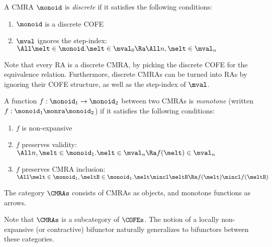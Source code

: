 \begin{defn}
  A CMRA $\monoid$ is \emph{discrete} if it satisfies the following conditions:
  \begin{enumerate}[itemsep=0pt]
  \item $\monoid$ is a discrete COFE
  \item $\mval$ ignores the step-index: \\
    $\All \melt \in \monoid. \melt \in \mval_0 \Ra \All n, \melt \in \mval_n$
  \end{enumerate}
\end{defn}
Note that every RA is a discrete CMRA, by picking the discrete COFE for the equivalence relation.
Furthermore, discrete CMRAs can be turned into RAs by ignoring their COFE structure, as well as the step-index of $\mval$.

\begin{defn}
  A function $f : \monoid_1 \to \monoid_2$ between two CMRAs is \emph{monotone} (written $f : \monoid_1 \monra \monoid_2$) if it satisfies the following conditions:
  \begin{enumerate}[itemsep=0pt]
  \item $f$ is non-expansive
  \item $f$ preserves validity: \\
    $\All n, \melt \in \monoid_1. \melt \in \mval_n \Ra f(\melt) \in \mval_n$
  \item $f$ preserves CMRA inclusion:\\
    $\All \melt \in \monoid_1, \meltB \in \monoid_1. \melt \mincl \meltB \Ra f(\melt) \mincl f(\meltB)$
  \end{enumerate}
\end{defn}

\begin{defn}
  The category $\CMRAs$ consists of CMRAs as objects, and monotone functions as arrows.
\end{defn}
Note that $\CMRAs$ is a subcategory of $\COFEs$.
The notion of a locally non-expansive (or contractive) bifunctor naturally generalizes to bifunctors between these categories.


